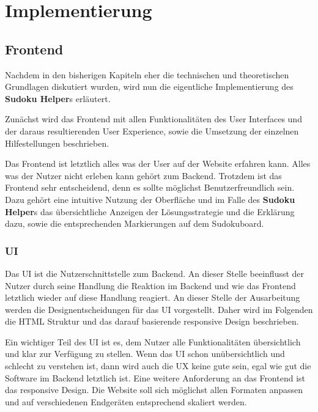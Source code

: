 
\part{Implementierung}

\chapter{Frontend}
Nachdem in den bisherigen Kapiteln eher die technischen und theoretischen Grundlagen diskutiert wurden, wird nun die eigentliche Implementierung des \textbf{Sudoku Helper}s erläutert.

Zunächst wird das Frontend mit allen Funktionalitäten des User Interfaces und der daraus resultierenden User Experience, sowie die Umsetzung der einzelnen Hilfestellungen beschrieben.

Das Frontend ist letztlich alles was der User auf der Website erfahren kann. Alles was der Nutzer nicht erleben kann gehört zum Backend. Trotzdem ist das Frontend sehr entscheidend, denn es sollte möglichst Benutzerfreundlich sein. Dazu gehört eine intuitive Nutzung der Oberfläche und im Falle des \textbf{Sudoku Helper}s das übersichtliche Anzeigen der Lösungsstrategie und die Erklärung dazu, sowie die entsprechenden Markierungen auf dem Sudokuboard.

\section{\acl{UI}}
Das \ac{UI} ist die Nutzerschnittstelle zum Backend. An dieser Stelle beeinflusst der Nutzer durch seine Handlung die Reaktion im Backend und wie das Frontend letztlich wieder auf diese Handlung reagiert. An dieser Stelle der Ausarbeitung werden die Designentscheidungen für das \ac{UI} vorgestellt. Daher wird im Folgenden die \ac{HTML} Struktur und das darauf basierende responsive Design beschrieben.

Ein wichtiger Teil des \ac{UI} ist es, dem Nutzer alle Funktionalitäten übersichtlich und klar zur Verfügung zu stellen. Wenn das \ac{UI} schon unübersichtlich und schlecht zu verstehen ist, dann wird auch die \acs{UX} keine gute sein, egal wie gut die Software im Backend letztlich ist. Eine weitere Anforderung an das Frontend ist das responsive Design. Die Website soll sich möglichst allen Formaten anpassen und auf verschiedenen Endgeräten entsprechend skaliert werden.

